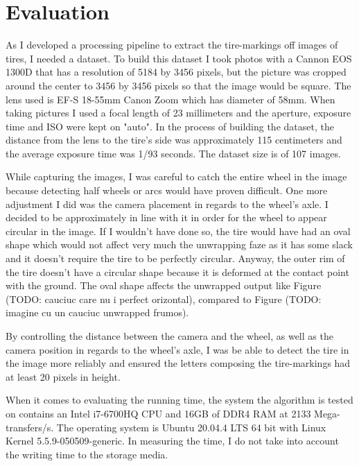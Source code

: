 \chapter{Evaluation}\pagestyle{fancy}\setlength{\parindent}{3em}
\label{chap:evaluation}

As I developed a processing pipeline to extract the tire-markings off images of tires, I needed a dataset. To build this dataset I took photos with a Cannon EOS 1300D that has a resolution of 5184 by 3456 pixels, but the picture was cropped around the center to 3456 by 3456 pixels so that the image would be square. The lens used is EF-S 18-55mm Canon Zoom which has diameter of 58mm. When taking pictures I used a focal length of 23 millimeters and the aperture, exposure time and ISO were kept on "auto". In the process of building the dataset, the distance from the lens to the tire's side was approximately 115 centimeters and the average exposure time was 1/93 seconds. The dataset size is of 107 images.

While capturing the images, I was careful to catch the entire wheel in the image because detecting half wheels or arcs would have proven difficult. One more adjustment I did was the camera placement in regards to the wheel's axle. I decided to be approximately in line with it in order for the wheel to appear circular in the image. If I wouldn't have done so, the tire would have had an oval shape which would not affect very much the unwrapping faze as it has some slack and it doesn't require the tire to be perfectly circular. Anyway, the outer rim of the tire doesn't have a circular shape because it is deformed at the contact point with the ground. The oval shape affects the unwrapped output like Figure (TODO: cauciuc care nu i perfect orizontal), compared to Figure (TODO: imagine cu un cauciuc unwrapped frumos).

By controlling the distance between the camera and the wheel, as  well as the camera position in regards to the wheel's axle, I was be able to detect the tire in the image more reliably and ensured the letters composing the tire-markings had at least 20 pixels in height.

When it comes to evaluating the running time, the system the algorithm is tested on contains an Intel i7-6700HQ CPU and 16GB of DDR4 RAM at 2133 Mega-transfers/s. The operating system is Ubuntu 20.04.4 LTS 64 bit with Linux Kernel 5.5.9-050509-generic. In measuring the time, I do not take into account the writing time to the storage media.

